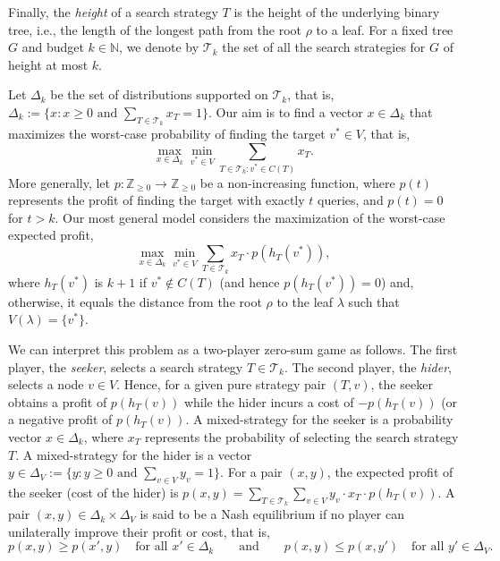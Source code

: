 \documentclass[11pt]{article}
\newcommand\+{\mkern2mu}
\newcommand{\T}{T}
\begin{document}
Finally, the \textit{height} of a search strategy $\T$ is the height of the underlying binary tree, i.e., the length of the longest path from the root $\rho$ to a leaf. For a fixed tree $G$ and budget $k\in \mathbb{N}$, we denote by $\mathcal{T}_k$ the set of all the search strategies for $G$ of height at most $k$. 

Let $\Delta_k$ be the set of distributions supported on $\mathcal{T}_k$, that is,  $\Delta_k:=\{x:  x\ge 0 \text{ and } \sum_{\T\in \mathcal{T}_k}x_{\T}=1 \}$. Our aim is to find a vector $x\in \Delta_k$ that maximizes the worst-case probability of finding the target $v^*\in V$, that is,
\begin{equation}
\label{eq:unitValue}
\max_{x\in \Delta_k} \min_{v^* \in V} \sum_{\T \in \mathcal{T}_k: v^* \in C(\T)} x_{\T}.
\end{equation}
More generally, let $p: \mathbb{Z}_{\ge 0}\rightarrow \mathbb{Z}_{\ge 0}$ be a non-increasing function, where $p(t)$ represents the profit of finding the target with exactly $t$ queries, and $p(t)=0$ for $t>k$.  Our most general model considers the maximization of the worst-case expected profit,
\begin{equation}
\label{eq:arbitraryValue}
\max_{x\in \Delta_k} \min_{v^* \in V} \sum_{\T \in \mathcal{T}_k} x_{\T}\cdot p(h_T(v^*)),
\end{equation}
where $h_{\T}(v^*)$ is $k+1$ if $v^*\not\in C(\T)$ (and hence $p(h_{\T}(v^*))=0$) and, otherwise, it equals the distance from the root $\rho$ to the leaf $\lambda$ such that $V(\lambda)=\{v^*\}$. 

We can interpret this problem as a two-player zero-sum game as follows. The first player, the \textit{seeker}, selects a search strategy $\T\in \mathcal{T}_k$. The second player, the \textit{hider}, selects a node $v\in V$. Hence, for a given pure strategy pair $(\T,v)$, the seeker obtains a profit of $p(h_{\T}(v))$ while the hider incurs a cost of $-p(h_{\T}(v))$ (or a negative profit of $p(h_{\T}(v))$. A mixed-strategy for the seeker is a probability vector $x\in \Delta_k$, where $x_{\T}$ represents the probability of selecting the search strategy $\T$. A mixed-strategy for the hider is a vector $y\in \Delta_V := \{y: y\ge 0 \text{ and } \sum_{v\in V} y_v =1\}$. For a pair $(x,y)$, the expected profit of the seeker (cost of the hider) is 
$ 
p(x,y) = \sum_{\T \in \mathcal{T}_k} \sum_{v\in V} y_v\cdot x_{\T}\cdot p(h_T(v)).
$
A pair $(x,y)\in \Delta_k \times \Delta_V$ is said to be a Nash equilibrium if no player can unilaterally improve their profit or cost, that is, 
$$
p(x,y) \ge p(x',y)   \quad \text{for all } x'\in \Delta_k \qquad \text{and} \qquad p(x,y) \le p(x,y')  \quad \text{for all } y'\in \Delta_V.
$$
\end{document}
